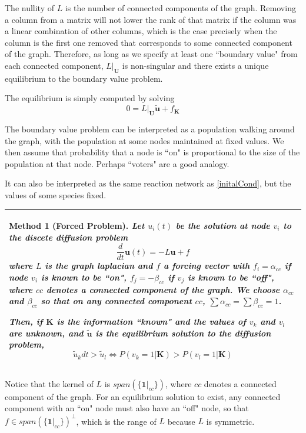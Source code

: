 \documentclass[10pt]{article}
\newtheorem{method}{Method}
\theoremstyle{definition}
\numberwithin{theorem}{section}
\numberwithin{definition}{section}
\numberwithin{lemma}{section}
\numberwithin{corollary}{section}
\numberwithin{clm}{section}
\numberwithin{rmk}{section}
\newenvironment{inbox2}
{\begin{center}
		\begin{tabular}{|p{0.9\textwidth}|}
			\hline \vspace{-0.5 cm}
		}
		{ 
			\\ \hline
		\end{tabular} 
	\end{center}
}
\renewcommand{\b}{\bm}
\begin{document}
The nullity of $L$ is the number of connected components of the graph. Removing a column from a matrix will not lower the rank of that matrix if the column was a linear combination of other columns, which is the case precisely when the column is the first one removed that corresponds to some connected component of the graph. Therefore, as long as we specify at least one ``boundary value" from each connected component, $L|_{\b{U}}$ is non-singular and there exists a unique equilibrium to the boundary value problem.

The equilibrium is simply computed by solving 
\[
0 = L|_{\b{U}}\b{\tilde{u}} + f_{\b{K}}
\]

The boundary value problem can be interpreted as a population walking around the graph, with the population at some nodes maintained at fixed values. We then assume that probability that a node is ``on" is proportional to the size of the population at that node. Perhaps ``voters" are a good analogy. 

It can also be interpreted as the same reaction network as \cref{initalCond}, but the values of some species fixed.

\begin{inbox2}
\begin{method}[Forced Problem]\label{forcing}
Let $u_i(t)$ be the solution at node $v_i$ to the discete diffusion problem
\[
\frac{d}{dt}\b{u}(t)  = - L\b{u} + f
\]
where $L$ is the  graph laplacian and $f$ a forcing vector with $f_i = \alpha_{cc}$ if node $v_i$ is known to be ``on", $f_j = -\beta_{cc}$ if $v_j$ is known to be ``off", where $cc$ denotes a connected component of the graph. We choose $\alpha_{cc}$ and $\beta_{cc}$ so that on any connected component $cc$, $\sum \alpha_{cc}= \sum \beta_{cc}= 1$. 

Then, if $\b{K}$ is the information ``known" and the values of $v_{k}$ and $v_{l}$ are unknown, and $\b{\tilde{u}}$ is the equilibrium solution to the diffusion problem,
\[
\tilde{u}_k dt >  \tilde{u}_l \Leftrightarrow  P(v_k=  1|\b{K}) > P(v_l = 1|\b{K})
\]
\end{method}
\end{inbox2}

Notice that the kernel of $L$ is $\mathit{span}(\{\b{1}|_{cc}\})$, where $cc$ denotes a connected component of the graph. For an equilibrium solution to exist, any connected component with an ``on" node must also have an ``off" node, so that $f \in \mathit{span}(\{\b{1}|_{cc}\})^{\perp}$, which is the range of $L$ because $L$ is symmetric. 
\end{document}
